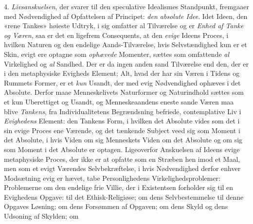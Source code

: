 4. \emph{Livsanskuelsen}, der svarer til den speculative
Idealismes Standpunkt, fremgaaer med Nødvendighed af Opfattelsen
af Principet: \emph{den absolute Idee}. Idet Ideen, den
«rene Tankes» høieste Udtryk, i sig omfatter al Tilværelse og
er \emph{Enhed af Tanke og Væren}, saa er det en ligefrem
Consequents, at den \emph{evige} Ideens Proces, i hvilken Naturen
og den endelige Aands-Tilværelse, hvis Selvstændighed kun er
et Skin, evigt ere optagne som \emph{ophævede} Momenter, sættes
som omfattende \emph{al} Virkelighed og \emph{al} Sandhed. Der er da
ingen anden sand Tilværelse end den, der er i den metaphysiske
Evigheds Element; Alt, hvad der har sin Væren i Tidens
og Rummets Former, er et \emph{kun} Usandt, der med evig Nødvendighed
ophæves i det Absolute. Derfor maae Menneskelivets
Naturformer og Naturindhold sættes som et kun Uberettiget
og Usandt, og Menneskeaandens eneste sande Væren
maa blive \emph{Tankens}, fra Individualitetens Begrændsning befriede,
contemplative Liv i \emph{Evighedens} Element: den Tankens
Form, i hvilken det Absolute vides som det i sin evige
Proces ene Værende, og det tænkende Subject veed sig som
Moment i det Absolute, i hvis Viden om sig Menneskets Viden
om det Absolute og om sig som Moment i det Absolute er
optagen. Ligeoverfor Anskuelsen af Ideens evige metaphysiske
Proces, der ikke er at opfatte som en Stræben hen imod et
Maal, men som et evigt Værendes Selvbekræftelse, i hvis Nødvendighed
derfor enhver Modsætning evig er hævet, tabe Personlighedens
Virkelighedsproblemer: Problemerne om den endelige
frie Villie, der i Existentsen forholder sig til en Evighedens
Opgave: til det Ethisk-Religiøse; om dens Selvbestemmelse
til denne Opgaves Løsning; om dens Forsømmen af
Opgaven; om dens Skyld og dens Udsoning af Skylden; om
